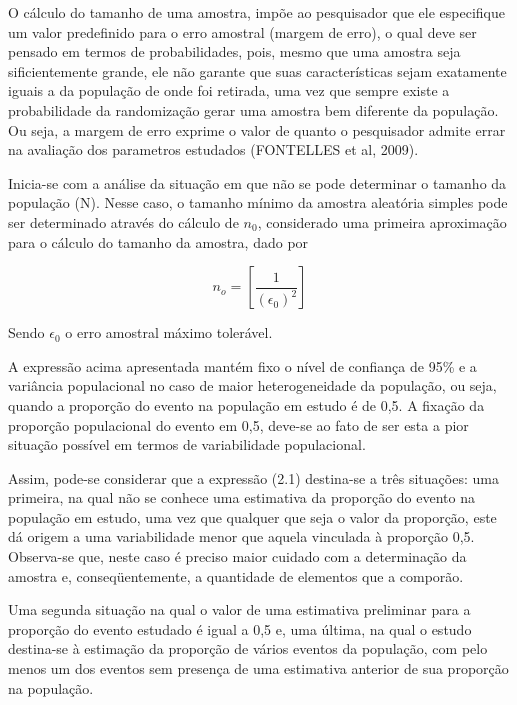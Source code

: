 \inic O cálculo do tamanho de uma amostra, impõe ao pesquisador
que ele especifique um valor predefinido para o erro amostral
(margem de erro), o qual deve ser pensado em termos de
probabilidades, pois, mesmo que uma amostra seja sificientemente
grande, ele não garante que suas características sejam exatamente
iguais a da população de onde foi retirada, uma vez que sempre
existe a probabilidade da randomização gerar uma amostra bem
diferente da população. Ou seja, a margem de erro exprime o valor
de quanto o pesquisador admite errar na avaliação dos parametros
estudados (FONTELLES et al, 2009).\vskip0.3cm

Inicia-se com a análise da situação em que não se pode determinar
o tamanho da população (N). Nesse caso, o tamanho mínimo da
amostra aleatória simples pode ser determinado através do cálculo
de $n_{0}$, considerado uma primeira aproximação para o cálculo do
tamanho da amostra, dado por


\begin{equation}\label{nzero}
    n_{o}= \left[  \frac{1}{\left(\epsilon_{0}\right)^2} \right]
\end{equation}

Sendo $\epsilon_{0}$ o erro amostral máximo tolerável.\vskip0.3cm

A expressão acima apresentada mantém fixo o nível de confiança de 95\% e a variância populacional no caso de maior heterogeneidade da população, ou seja, quando a proporção do evento na população em estudo é de 0,5. A fixação da proporção populacional do evento em 0,5, deve-se ao fato de ser esta a pior situação possível em termos de variabilidade populacional. \vskip0.3cm

Assim, pode-se considerar que a expressão (2.1) destina-se a três
situações: uma primeira, na qual não se conhece uma estimativa da
proporção do evento na população em estudo, uma vez que qualquer
que seja o valor da proporção, este dá origem a uma variabilidade
menor que aquela vinculada à proporção 0,5. Observa-se que, neste
caso é preciso maior cuidado com a determinação da amostra e,
conseqüentemente, a quantidade de elementos que a
comporão.\vskip0.3cm

Uma segunda situação na qual o valor de uma estimativa preliminar para a proporção do evento estudado é igual a 0,5 e, uma última, na qual o estudo destina-se à estimação da proporção de vários eventos da população, com pelo menos um dos eventos sem presença de uma estimativa anterior de sua proporção na população.\vskip0.3cm


